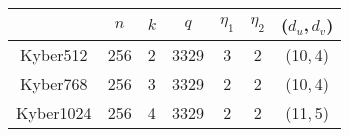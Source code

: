 \begin{tabular}{|c|c|c|c|c|c|c|}
  \hline
            & $n$ & $k$ & $q$  & $\eta_1$ & $\eta_2$ & ($d_u$,\,$d_v$) \\
  \hline
  Kyber512  & 256 & 2   & 3329 & 3        & 2        & (10,\,4)         \\
  Kyber768  & 256 & 3   & 3329 & 2        & 2        & (10,\,4)         \\
  Kyber1024 & 256 & 4   & 3329 & 2        & 2        & (11,\,5)         \\
  \hline
\end{tabular}
